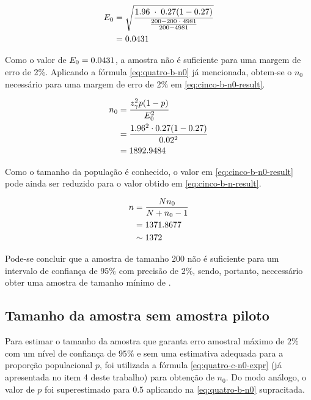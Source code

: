 \begin{align}
	\label{eq:cinco-b-e0-calc}
	E_0 &= \sqrt{\frac{1.96 \;\cdot\; 0.27 (1 - 0.27) }{\frac{200 - 200 \;\cdot\; 4981}{200 - 4981}}} \\
	    &= 0.0431 \nonumber
\end{align}

Como o valor de $E_0 = 0.0431$, a amostra não é suficiente para uma margem de erro de 2\%. Aplicando a fórmula \eqref{eq:quatro-b-n0} já mencionada, obtem-se o $n_0$ necessário para uma margem de erro de 2\% em \eqref{eq:cinco-b-n0-result}.

\begin{align}
	n_0 &= \frac{z_\gamma^2 p(1-p)}{E_0^2} \nonumber \\
	    &= \frac{1.96^2 \cdot 0.27(1-0.27)}{0.02^2} \nonumber \\
	    &= \label{eq:cinco-b-n0-result}
	       1892.9484	
\end{align}

Como o tamanho da população é conhecido, o valor em \eqref{eq:cinco-b-n0-result} pode ainda ser reduzido para o valor obtido em \eqref{eq:cinco-b-n-result}.

\begin{align}
	n &= \frac{N n_0}{N + n_0 - 1} \nonumber \\
    &= 1371.8677 \nonumber \\
	  &\sim \label{eq:cinco-b-n-result} 
	     1372
\end{align}

Pode-se concluir que a amostra de tamanho 200 não é suficiente para um intervalo de confiança de 95\% com precisão de 2\%, sendo, portanto, neccessário obter uma amostra de tamanho mínimo de \CINCOBnceil.


\subsection{Tamanho da amostra sem amostra piloto}

Para estimar o tamanho da amostra que garanta erro amostral máximo de $2\%$ com um nível de confiança de $95\%$ e sem uma estimativa adequada para a proporção populacional $p$, foi utilizada a fórmula \eqref{eq:quatro-c-n0-expr} (já apresentada no item 4 deste trabalho) para obtenção de $n_0$. 
Do modo análogo, o valor de $p$ foi superestimado para $0.5$ aplicando na \autoref{eq:quatro-b-n0} supracitada.

